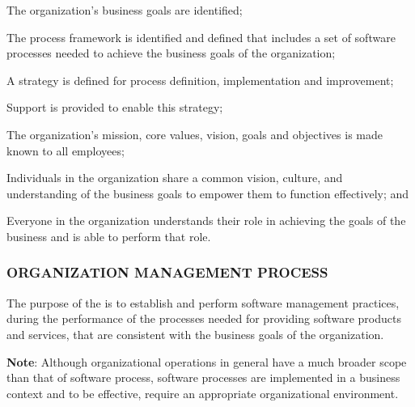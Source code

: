 			\begin{adjustwidth}{2em}{0pt}

				\begin{compactitem}

					\item The organization's business goals are identified;

					\item The process framework is identified and defined that includes a set of software processes needed to achieve the business goals of the organization;
					
					\item A strategy is defined for process definition, implementation and improvement;
					
					\item Support is provided to enable this strategy;
					
					\item The organization's mission, core values, vision, goals and objectives is made known to all employees;
					
					\item Individuals in the organization share a common vision, culture, and understanding of the business goals to empower them to function effectively; and
					
					\item Everyone in the organization understands their role in achieving the goals of the business and is able to perform that role.
				
				\end{compactitem}

			\end{adjustwidth}

		\newpage
		\subsubsection{ORGANIZATION MANAGEMENT PROCESS\label{proc:organization_management_process}}

			\begin{adjustwidth}{2em}{0pt} 

				The purpose of the  is to establish and perform software management practices, during the performance of the processes needed for providing software products and services, that are consistent with the business goals of the organization.

				{\bf Note}: Although organizational operations in general have a much broader scope than that of software process, software processes are implemented in a business context and to be effective, require an appropriate organizational environment.

			\end{adjustwidth}

